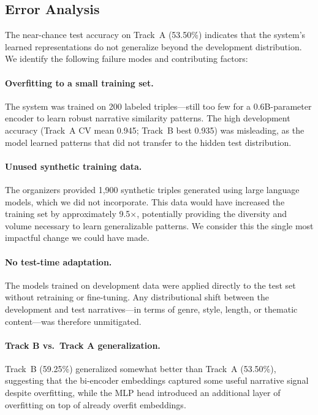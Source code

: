 \documentclass[11pt]{article}
\begin{document}
\subsection{Error Analysis}

The near-chance test accuracy on Track~A (53.50\%) indicates that the system's learned representations do not generalize beyond the development distribution. We identify the following failure modes and contributing factors:

\paragraph{Overfitting to a small training set.} The system was trained on 200 labeled triples---still too few for a 0.6B-parameter encoder to learn robust narrative similarity patterns. The high development accuracy (Track~A CV mean 0.945; Track~B best 0.935) was misleading, as the model learned patterns that did not transfer to the hidden test distribution.

\paragraph{Unused synthetic training data.} The organizers provided 1,900 synthetic triples generated using large language models, which we did not incorporate. This data would have increased the training set by approximately 9.5$\times$, potentially providing the diversity and volume necessary to learn generalizable patterns. We consider this the single most impactful change we could have made.

\paragraph{No test-time adaptation.} The models trained on development data were applied directly to the test set without retraining or fine-tuning. Any distributional shift between the development and test narratives---in terms of genre, style, length, or thematic content---was therefore unmitigated.

\paragraph{Track B vs.\ Track A generalization.} Track~B (59.25\%) generalized somewhat better than Track~A (53.50\%), suggesting that the bi-encoder embeddings captured some useful narrative signal despite overfitting, while the MLP head introduced an additional layer of overfitting on top of already overfit embeddings.
\end{document}
